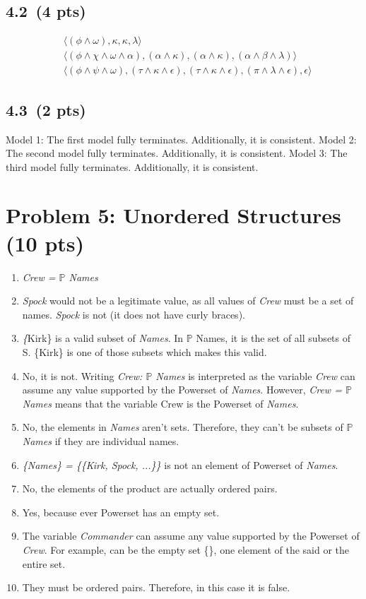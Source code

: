 \documentclass[12pt]{article}
\begin{document}
\subsection*{4.2 \,(4 pts)}
\begin{align*}
    &\langle (\phi \wedge \omega), \kappa, \kappa, \lambda \rangle \\
    &\langle (\phi \wedge \chi \wedge \omega \wedge \alpha), (\alpha \wedge \kappa), (\alpha \wedge \kappa), (\alpha \wedge \beta \wedge \lambda) \rangle \\
    &\langle (\phi \wedge \psi \wedge \omega), (\tau \wedge \kappa \wedge \epsilon), (\tau \wedge \kappa \wedge \epsilon), (\pi \wedge \lambda \wedge \epsilon), \epsilon \rangle
\end{align*}

\subsection*{4.3 \,(2 pts)}
Model 1: The first model fully terminates. Additionally, it is consistent.
Model 2: The second model fully terminates. Additionally, it is consistent.
Model 3: The third model fully terminates. Additionally, it is consistent.
\newpage
\section*{Problem 5: Unordered Structures (10 pts)}
\begin{enumerate}
    \item \textit{Crew = $\mathbb{P}$ Names}
    \item \textit{Spock} would not be a legitimate value, as all values of \textit{Crew} must be a set of names. \textit{Spock} is not (it does not have curly braces).
    \item \textit\{Kirk\} is a valid subset of \textit{Names}. In $\mathbb{P}$ Names, it is the set of all subsets of S. \{Kirk\} is one of those subsets which makes this valid.
    \item No, it is not. Writing \textit{Crew: $\mathbb{P}$ Names} is interpreted as the variable \textit{Crew} can assume any value supported by the Powerset of \textit{Names}. However, \textit{Crew = $\mathbb{P}$ Names} means that the variable Crew is the Powerset of \textit{Names}.
    \item No, the elements in \textit{Names} aren't sets. Therefore, they can't be subsets of \textit{$\mathbb{P}$ Names} if they are individual names.
    \item \textit{\{Names\} = \{\{Kirk, Spock, ...\}\}} is not an element of Powerset of \textit{Names}.
    \item No, the elements of the product are actually ordered pairs.
    \item Yes, because ever Powerset has an empty set.
    \item The variable \textit{Commander} can assume any value supported by the Powerset of \textit{Crew}. For example, can be the empty set \{\}, one element of the said or the entire set.
    \item They must be ordered pairs. Therefore, in this case it is false.
\end{enumerate}
\newpage
\end{document}
